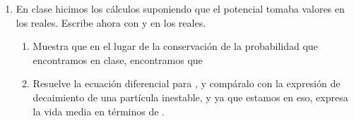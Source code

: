 \begin{enumerate}
  \item En clase hicimos los cálculos suponiendo que el potencial tomaba valores en los reales. Escribe ahora
  con  y \ec{\Gamma} en los reales.
      \begin{enumerate}
          \item Muestra que en el lugar de la conservación de la probabilidad que encontramos en clase, encontramos que 
          
          
          
          
          
          \item Resuelve la ecuación diferencial para , y compáralo con la expresión de decaimiento de una partícula inestable, y ya que estamos en eso, expresa la vida media en términos de \ec{\Gamma  }.
      \end{enumerate}
  
  
  
  
  
  
  
  
\end{enumerate}










